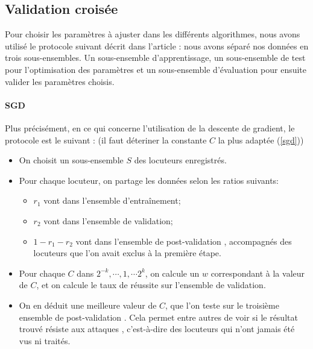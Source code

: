\documentclass{article}
\begin{document}
\subsection{Validation croisée}
Pour choisir les paramètres à ajuster dans les différents algorithmes, nous avons utilisé le protocole suivant décrit dans l'article : nous avons séparé nos données en trois sous-ensembles. Un sous-ensemble d'apprentissage, un sous-ensemble de test pour l'optimisation des paramètres et un sous-ensemble d'évaluation pour ensuite valider les paramètres choisis.

\paragraph{SGD} Plus précisément, en ce qui concerne l'utilisation de la descente de gradient, le protocole est le suivant :
(il faut déteriner la constante $C$ la plus adaptée (\ref{sgd}))
\begin{itemize}
\item On choisit un sous-ensemble $S$ des locuteurs enregistrés.
\item Pour chaque locuteur, on partage les données selon les ratios suivants:
\begin{itemize}
\item $r_1$ vont dans l'ensemble d'entraînement;
\item $r_2$ vont dans l'ensemble de validation;
\item $1 - r_1 - r_2$ vont dans l'ensemble de \og post-validation \fg, accompagnés des locuteurs que l'on avait exclus à la première étape.
\end{itemize}
\item Pour chaque $C$ dans $2^{-k}, \dotsi, 1, \dotsi 2^k$, on calcule un $w$ correspondant à la valeur de $C$, et on calcule le taux de réussite sur l'ensemble de validation.
\item On en déduit une meilleure valeur de $C$, que l'on teste sur le troisième ensemble de \og post-validation \fg. Cela permet entre autres de voir si le résultat trouvé résiste aux \og attaques \fg, c'est-à-dire des locuteurs qui n'ont jamais été vus ni traités.
\end{itemize}
\end{document}
